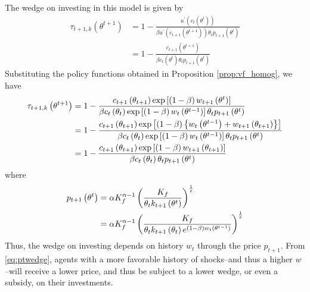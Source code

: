 \documentclass[11pt]{article}
\begin{document}
The wedge on investing in this model is given by 
\begin{align*}
\tau_{t+1,k}\left(\theta^{t+1}\right) & =1-\frac{u^{\prime}\left(c_{t}\left(\theta^{t}\right)\right)}{\beta u^{\prime}\left(c_{t+1}\left(\theta^{t+1}\right)\right)\theta_{t}p_{t+1}\left(\theta^{t}\right)}\\
 & =1-\frac{c_{t+1}\left(\theta^{t+1}\right)}{\beta c_{t}\left(\theta^{t}\right)\theta_{t}p_{t+1}\left(\theta^{t}\right)}
\end{align*}
Substituting the policy functions obtained in Proposition \ref{prop:vf_homog}, we have 
\begin{align}
\tau_{t+1,k}\left(\theta^{t+1}\right) & =1-\frac{c_{t+1}\left(\theta_{t+1}\right)\exp\left[\left(1-\beta\right)w_{t+1}\left(\theta^{t}\right)\right]}{\beta c_{t}\left(\theta_{t}\right)\exp\left[\left(1-\beta\right)w_{t}\left(\theta^{t-1}\right)\right]\theta_{t}p_{t+1}\left(\theta^{t}\right)} \notag \\
 & =1-\frac{c_{t+1}\left(\theta_{t+1}\right)\exp\left[\left(1-\beta\right)\left\{ w_{t}\left(\theta^{t-1}\right)+w_{t+1}\left(\theta_{t+1}\right)\right\} \right]}{\beta c_{t}\left(\theta_{t}\right)\exp\left[\left(1-\beta\right)w_{t}\left(\theta^{t-1}\right)\right]\theta_{t}p_{t+1}\left(\theta^{t}\right)} \notag \\ 
 & =1-\frac{c_{t+1}\left(\theta_{t+1}\right)\exp\left[\left(1-\beta\right)w_{t+1}\left(\theta_{t+1}\right)\right]}{\beta c_{t}\left(\theta_{t}\right)\theta_{t}p_{t+1}\left(\theta^{t}\right)}
\end{align}
where
\begin{align}
p_{t+1}\left(\theta^{t}\right) & =\alpha K_{f}^{\alpha-1}\left(\frac{K_{f}}{\theta_{t}k_{t+1}\left(\theta^{t}\right)}\right)^{\frac{1}{\varepsilon}} \notag \\
 & =\alpha K_{f}^{\alpha-1}\left(\frac{K_{f}}{\theta_{t}k_{t+1}\left(\theta_{t}\right)e^{\left(1-\beta\right)w_{t}\left(\theta^{t-1}\right)}}\right)^{\frac{1}{\varepsilon}} \label{eq:ptwedge}
\end{align}
Thus, the wedge on investing depends on history $w_{t}$ through the
price $p_{t+1}$. From \eqref{eq:ptwedge}, agents with a more favorable history of shocks--and thus a higher \( w \)--will receive a lower price, and thus be subject to a lower wedge, or even a subsidy, on their investments.
\end{document}
